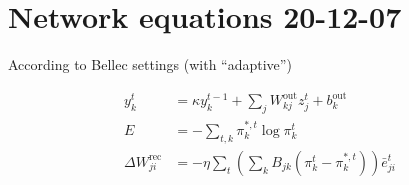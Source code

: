 \documentclass{article}
\begin{document}
\section{Network equations 20-12-07}
According to Bellec settings (with ``adaptive'')


\begin{align*}


y^t_k &= \kappa y^{t-1}_k + \sum_j W^\text{out}_{kj}z^t_j+b^\text{out}_k\\
E &= -\sum_{t,k}\pi_k^{*,t}\log\pi_k^t\\
\Delta W^\text{rec}_{ji} &= -\eta\sum_t\left(\sum_kB_{jk}\left(\pi_k^t-\pi_k^{*,t}\right)\right)\bar{e}^t_{ji}\\
\end{align*}
\end{document}
